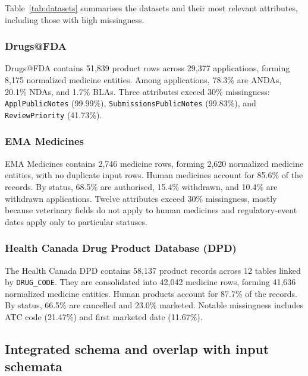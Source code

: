 \documentclass[a4paper,oneside]{scrbook}
\begin{document}
Table~\ref{tab:datasets} summarises the datasets and their most relevant attributes, including those with high missingness.

\subsubsection*{Drugs@FDA}
Drugs@FDA contains 51,839 product rows across 29,377 applications, forming 8,175 normalized medicine entities. Among applications, 78.3\% are ANDAs, 20.1\% NDAs, and 1.7\% BLAs. Three attributes exceed 30\% missingness: \texttt{ApplPublicNotes} (99.99\%), \texttt{SubmissionsPublicNotes} (99.83\%), and \texttt{ReviewPriority} (41.73\%).

\subsubsection*{EMA Medicines}
EMA Medicines contains 2,746 medicine rows, forming 2,620 normalized medicine entities, with no duplicate input rows. Human medicines account for 85.6\% of the records. By status, 68.5\% are authorised, 15.4\% withdrawn, and 10.4\% are withdrawn applications. Twelve attributes exceed 30\% missingness, mostly because veterinary fields do not apply to human medicines and regulatory-event dates apply only to particular statuses.

\subsubsection*{Health Canada Drug Product Database (DPD)}
The Health Canada DPD contains 58,137 product records across 12 tables linked by \texttt{DRUG\_CODE}. They are consolidated into 42,042 medicine rows, forming 41,636 normalized medicine entities. Human products account for 87.7\% of the records. By status, 66.5\% are cancelled and 23.0\% marketed. Notable missingness includes ATC code (21.47\%) and first marketed date (11.67\%).

\subsection{Integrated schema and overlap with input schemata}
\end{document}
